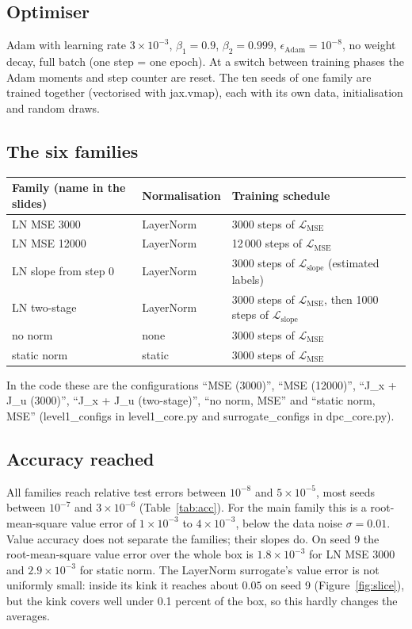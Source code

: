 \documentclass[11pt]{article}
\begin{document}
\subsection{Optimiser}
Adam with learning rate $3\times10^{-3}$, $\beta_1=0.9$, $\beta_2=0.999$, $\epsilon_{\text{Adam}}=10^{-8}$, no weight decay, full batch (one step = one epoch). At a switch between training phases the Adam moments and step counter are reset. The ten seeds of one family are trained together (vectorised with jax.vmap), each with its own data, initialisation and random draws.

\subsection{The six families}
\begin{center}
\begin{tabular}{lll}
\toprule
Family (name in the slides) & Normalisation & Training schedule \\
\midrule
LN MSE 3000 & LayerNorm & 3000 steps of $\mathcal L_{\text{MSE}}$ \\
LN MSE 12000 & LayerNorm & 12\,000 steps of $\mathcal L_{\text{MSE}}$ \\
LN slope from step 0 & LayerNorm & 3000 steps of $\mathcal L_{\text{slope}}$ (estimated labels) \\
LN two-stage & LayerNorm & 3000 steps of $\mathcal L_{\text{MSE}}$, then 1000 steps of $\mathcal L_{\text{slope}}$ \\
no norm & none & 3000 steps of $\mathcal L_{\text{MSE}}$ \\
static norm & static & 3000 steps of $\mathcal L_{\text{MSE}}$ \\
\bottomrule
\end{tabular}
\end{center}
In the code these are the configurations ``MSE (3000)'', ``MSE (12000)'', ``J\_x + J\_u (3000)'', ``J\_x + J\_u (two-stage)'', ``no norm, MSE'' and ``static norm, MSE'' (level1\_configs in level1\_core.py and surrogate\_configs in dpc\_core.py).

\subsection{Accuracy reached}
All families reach relative test errors between $10^{-8}$ and $5\times10^{-5}$, most seeds between $10^{-7}$ and $3\times10^{-6}$ (Table~\ref{tab:acc}). For the main family this is a root-mean-square value error of $1\times10^{-3}$ to $4\times10^{-3}$, below the data noise $\sigma=0.01$. Value accuracy does not separate the families; their slopes do. On seed 9 the root-mean-square value error over the whole box is $1.8\times10^{-3}$ for LN MSE 3000 and $2.9\times10^{-3}$ for static norm. The LayerNorm surrogate's value error is not uniformly small: inside its kink it reaches about $0.05$ on seed 9 (Figure~\ref{fig:slice}), but the kink covers well under 0.1 percent of the box, so this hardly changes the averages.
\end{document}
